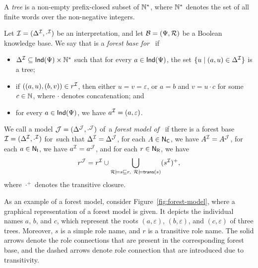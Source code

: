 \begin{definition}\label{def:forest-model}
    A \emph{tree} is a non-empty prefix-closed subset of $\mathbb{N}^*$, where
    $\mathbb{N}^*$ denotes the set of all finite words over the non-negative integers.

    Let $\mathcal{I}=(\Delta^\mathcal{I},\cdot^\mathcal{I})$ be an interpretation, and let
    $\mathcal{B}=(\Psi,\mathcal{R})$ be a Boolean knowledge base.  We say that
    \Imc is a \emph{forest base for~\Bmc} if
    \begin{itemize}
        \item $\Delta^\mathcal{I}\subseteq\mathsf{Ind}(\Psi)\times\mathbb{N}^*$ such that for every
            $a\in\mathsf{Ind}(\Psi)$, the set $\{u\mid(a,u)\in\Delta^\mathcal{I}\}$ is a tree;
        \item if $((a,u),(b,v))\in r^\mathcal{I}$, then either $u=v=\varepsilon$, or
            $a=b$ and $v=u\cdot c$ for some $c\in\mathbb{N}$, where $\cdot$ denotes
            concatenation; and
        \item for every $a\in\mathsf{Ind}(\Psi)$, we have $a^\mathcal{I}=(a,\varepsilon)$.
    \end{itemize}
    We call a model $\mathcal{J}=(\Delta^\mathcal{J},\cdot^\mathcal{J})$ of~\Bmc a \emph{forest model
    of~\Bmc{}} if there is a forest base $\mathcal{I}=(\Delta^\mathcal{I},\cdot^\mathcal{I})$
    for~\Bmc such that $\Delta^\mathcal{I}=\Delta^\mathcal{J}$, for each $A\in\mathsf{N_C}$, we have
    $A^\mathcal{I}=A^\mathcal{J}$, for each $a\in\mathsf{N_I}$, we have $a^\mathcal{I}=a^\mathcal{J}$, and for each
    $r\in\mathsf{N_R}$, we have
    \[r^\mathcal{J}=r^\mathcal{I}\cup\bigcup_{\mathcal{R}\models s\sqsubseteq r,\
        \mathcal{R}\models\mathsf{trans}(s)}(s^\mathcal{I})^+,\]
    where $\cdot^+$ denotes the transitive closure.
\end{definition}

\noindent
As an example of a forest model, consider Figure~\ref{fig:forest-model}, where a
graphical representation of a forest model is given.  It depicts the individual
names $a$, $b$, and $c$, which represent the roots $(a,\varepsilon)$,
$(b,\varepsilon)$, and $(c,\varepsilon)$ of three trees.  Moreover, $s$ is a
simple role name, and $r$ is a transitive role name.  The solid arrows denote
the role connections that are present in the corresponding forest base, and the
dashed arrows denote role connection that are introduced due to transitivity.

